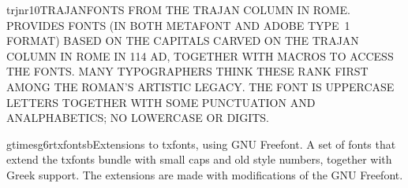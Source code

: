 \documentclass{ddltxtyp}
\begin{document}

\begin{package}{trjnr10}{TRAJAN}{\uppercase{Fonts from the Trajan column in Rome.}}
\uppercase{Provides fonts (in both MetaFont and Adobe Type~1 format) based
on the capitals carved on the Trajan column in Rome in 114 AD,
together with macros to access the fonts. Many typographers
think these rank first among the Roman's artistic legacy. The
font is uppercase letters together with some punctuation and
analphabetics; no lowercase or digits.}
\end{package}

\begin{package}{gtimesg6r}{txfontsb}{Extensions to txfonts, using GNU Freefont.}
A set of fonts that extend the txfonts bundle with small caps
and old style numbers, together with Greek support. The
extensions are made with modifications of the GNU Freefont.
\end{package}
\end{document}
